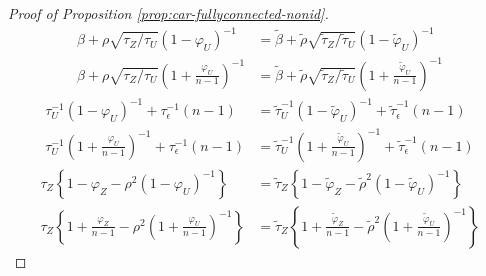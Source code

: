 \documentclass[11pt]{article}
\theoremstyle{definition}
\theoremstyle{remark}
\begin{document}
\begin{proof}[Proof of Proposition \ref{prop:car-fullyconnected-nonid}]
\begin{align}
\beta + \rho\sqrt{\tau_Z/\tau_U}(1-\varphi_U)^{-1} &= \tilde\beta + \tilde\rho\sqrt{\tilde\tau_Z/\tilde\tau_U}(1-\tilde\varphi_U)^{-1}\label{eq:fullyconnected-exp-product-1} \\
\beta + \rho\sqrt{\tau_Z/\tau_U}\left(1+\frac{\varphi_U}{n-1}\right)^{-1} &= \tilde\beta + \tilde\rho\sqrt{\tilde\tau_Z/\tilde\tau_U}\left(1+\frac{\tilde\varphi_U}{n-1}\right)^{-1}\label{eq:fullyconnected-exp-product-n-1} 
\end{align}
\begin{align}
\tau_U^{-1}(1-\varphi_U)^{-1} + \tau_\epsilon^{-1} (n-1) &= \tilde\tau_U^{-1}(1-\tilde\varphi_U)^{-1} + \tilde\tau_\epsilon^{-1}(n-1)\label{eq:fullyconnected-condvar-1} \\
\tau_U^{-1}\left(1+\frac{\varphi_U}{n-1}\right)^{-1}  + \tau_\epsilon^{-1} (n-1) &= \tilde\tau_U^{-1}\left(1+\frac{\tilde\varphi_U}{n-1}\right)^{-1}  + \tilde\tau_\epsilon^{-1}(n-1)\label{eq:fullyconnected-condvar-n-1} 
\end{align}
\begin{align}
\tau_Z\left\{1 - \varphi_Z - \rho^2(1-\varphi_U)^{-1}\right\} &= \tilde\tau_Z\left\{1 - \tilde\varphi_Z - \tilde\rho^2(1-\tilde\varphi_U)^{-1}\right\}\label{eq:fullyconnected-precision-1} \\
\tau_Z\left\{1 + \frac{\varphi_Z}{n-1} - \rho^2\left(1+\frac{\varphi_U}{n-1}\right)^{-1}\right\} &= \tilde\tau_Z\left\{1 + \frac{\tilde\varphi_Z}{n-1} - \tilde\rho^2\left(1+\frac{\tilde\varphi_U}{n-1}\right)^{-1}\right\}\label{eq:fullyconnected-precision-n-1} 
\end{align}




\end{proof}
\end{document}
